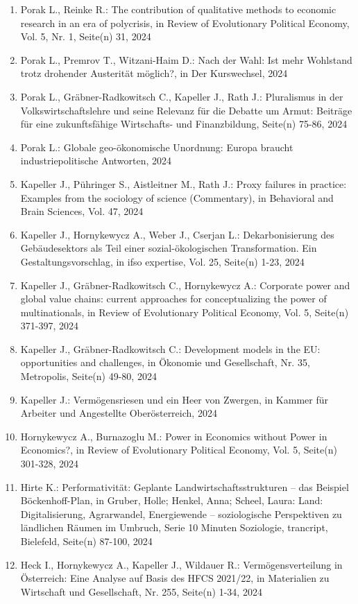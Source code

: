 \begin{enumerate}
	 \item Porak L., Reinke R.: The contribution of qualitative methods to economic research in an era of polycrisis, in Review of Evolutionary Political Economy, Vol. 5, Nr. 1, Seite(n) 31, 2024
	 \item Porak L., Premrov T., Witzani-Haim D.: Nach der Wahl: Ist mehr Wohl­stand trotz dro­hen­der Aus­teri­tät möglich?, in Der Kurswechsel, 2024
	 \item Porak L., Gräbner-Radkowitsch C., Kapeller J., Rath J.: Pluralismus in der Volkswirtschaftslehre und seine Relevanz für die Debatte um Armut: Beiträge für eine zukunftsfähige Wirtschafts- und Finanzbildung, Seite(n) 75-86, 2024
	 \item Porak L.: Globale geo-ökonomische Unordnung: Europa braucht industriepolitische Antworten, 2024
	 \item Kapeller J., Pühringer S., Aistleitner M., Rath J.: Proxy failures in practice: Examples from the sociology of science (Commentary), in Behavioral and Brain Sciences, Vol. 47, 2024
	 \item Kapeller J., Hornykewycz A., Weber J., Cserjan L.: Dekarbonisierung des Gebäudesektors als Teil einer sozial-ökologischen Transformation. Ein Gestaltungsvorschlag, in ifso expertise, Vol. 25, Seite(n) 1-23, 2024
	 \item Kapeller J., Gräbner-Radkowitsch C., Hornykewycz A.: Corporate power and global value chains: current approaches for conceptualizing the power of multinationals, in Review of Evolutionary Political Economy, Vol. 5, Seite(n) 371-397, 2024
	 \item Kapeller J., Gräbner-Radkowitsch C.: Development models in the EU:  opportunities and challenges, in Ökonomie und Gesellschaft, Nr. 35, Metropolis, Seite(n) 49-80, 2024
	 \item Kapeller J.: Vermögensriesen und ein Heer von Zwergen, in Kammer für Arbeiter und Angestellte Oberösterreich, 2024
	 \item Hornykewycz A., Burnazoglu M.: Power in Economics without Power in Economics?, in Review of Evolutionary Political Economy, Vol. 5, Seite(n) 301-328, 2024
	 \item Hirte K.: Performativität: Geplante Landwirtschaftsstrukturen – das Beispiel Böckenhoff-Plan, in Gruber, Holle; Henkel, Anna; Scheel, Laura: Land: Digitalisierung, Agrarwandel, Energiewende – soziologische Perspektiven zu ländlichen Räumen im Umbruch, Serie 10 Minuten Soziologie, trancript, Bielefeld, Seite(n) 87-100, 2024
	 \item Heck I., Hornykewycz A., Kapeller J., Wildauer R.: Vermögensverteilung  in Österreich: Eine Analyse auf Basis des HFCS 2021/22, in Materialien zu Wirtschaft und Gesellschaft, Nr. 255, Seite(n) 1-34, 2024

\end{enumerate}
